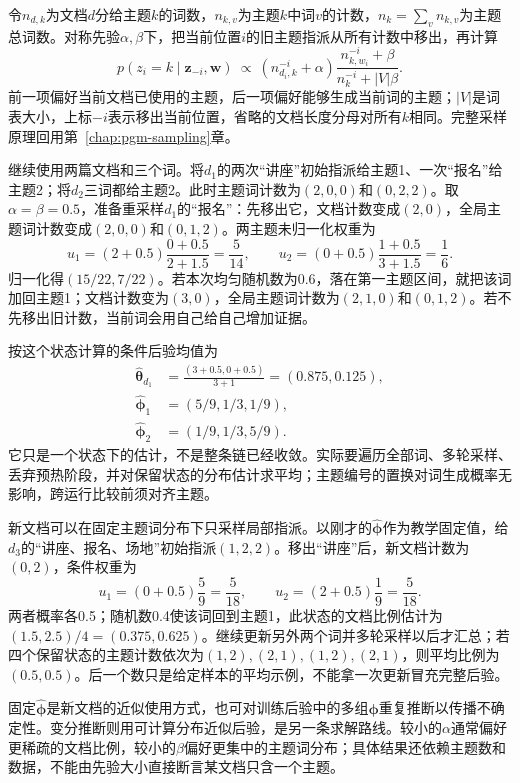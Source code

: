 令$n_{d,k}$为文档$d$分给主题$k$的词数，$n_{k,v}$为主题$k$中词$v$的计数，$n_k=\sum_vn_{k,v}$为主题总词数。对称先验$\alpha,\beta$下，把当前位置$i$的旧主题指派从所有计数中移出，再计算
\begin{equation}
 \label{eq:nlp-classification-lda-gibbs}
 p(z_i=k\mid\bm z_{-i},\bm w)\ \propto\
 (n_{d_i,k}^{-i}+\alpha)
 \frac{n_{k,w_i}^{-i}+\beta}{n_k^{-i}+|V|\beta}.
\end{equation}
前一项偏好当前文档已使用的主题，后一项偏好能够生成当前词的主题；$|V|$是词表大小，上标$-i$表示移出当前位置，省略的文档长度分母对所有$k$相同。完整采样原理回用第~\ref{chap:pgm-sampling}章。

继续使用两篇文档和三个词。将$d_1$的两次“讲座”初始指派给主题1、一次“报名”给主题2；将$d_2$三词都给主题2。此时主题词计数为$(2,0,0)$和$(0,2,2)$。取$\alpha=\beta=0.5$，准备重采样$d_1$的“报名”：先移出它，文档计数变成$(2,0)$，全局主题词计数变成$(2,0,0)$和$(0,1,2)$。两主题未归一化权重为
\[
 u_1=(2+0.5)\frac{0+0.5}{2+1.5}=\frac5{14},\qquad
 u_2=(0+0.5)\frac{1+0.5}{3+1.5}=\frac16.
\]
归一化得$(15/22,7/22)$。若本次均匀随机数为0.6，落在第一主题区间，就把该词加回主题1；文档计数变为$(3,0)$，全局主题词计数为$(2,1,0)$和$(0,1,2)$。若不先移出旧计数，当前词会用自己给自己增加证据。

按这个状态计算的条件后验均值为
\[
 \begin{aligned}
   \widehat{\bm\theta}_{d_1}
   &=\frac{(3+0.5,0+0.5)}{3+1}=(0.875,0.125),\\
   \widehat{\bm\phi}_1&=(5/9,1/3,1/9),\\
   \widehat{\bm\phi}_2&=(1/9,1/3,5/9).
 \end{aligned}
\]
它只是一个状态下的估计，不是整条链已经收敛。实际要遍历全部词、多轮采样、丢弃预热阶段，并对保留状态的分布估计求平均；主题编号的置换对词生成概率无影响，跨运行比较前须对齐主题。

新文档可以在固定主题词分布下只采样局部指派。以刚才的$\widehat{\bm\phi}$作为教学固定值，给$d_3$的“讲座、报名、场地”初始指派$(1,2,2)$。移出“讲座”后，新文档计数为$(0,2)$，条件权重为
\[
 u_1=(0+0.5)\frac59=\frac5{18},\qquad
 u_2=(2+0.5)\frac19=\frac5{18}.
\]
两者概率各0.5；随机数0.4使该词回到主题1，此状态的文档比例估计为$(1.5,2.5)/4=(0.375,0.625)$。继续更新另外两个词并多轮采样以后才汇总；若四个保留状态的主题计数依次为$(1,2),(2,1),(1,2),(2,1)$，则平均比例为$(0.5,0.5)$。后一个数只是给定样本的平均示例，不能拿一次更新冒充完整后验。

固定$\widehat{\bm\phi}$是新文档的近似使用方式，也可对训练后验中的多组$\bm\phi$重复推断以传播不确定性。变分推断则用可计算分布近似后验，是另一条求解路线。较小的$\alpha$通常偏好更稀疏的文档比例，较小的$\beta$偏好更集中的主题词分布；具体结果还依赖主题数和数据，不能由先验大小直接断言某文档只含一个主题。

